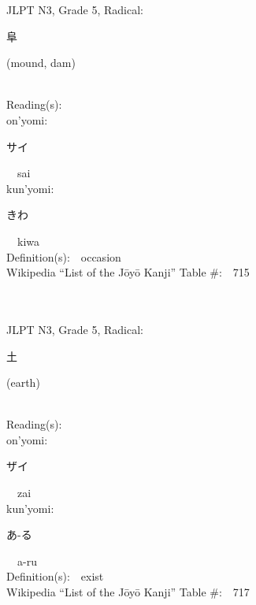 \begin{multicols}{2}
{JLPT N3, Grade 5, Radical:\ \ {\begin{CJK}{UTF8}{min} 阜 \end{CJK}} (mound, dam) } \\
Reading(s):\ \ \\
{\hspace*{1em}}on'yomi:\ \ \\
{\hspace*{2em}}{\begin{CJK}{UTF8}{min} サイ \end{CJK}}\ \ sai\ \ \\
{\hspace*{1em}}kun'yomi:\ \ \\
{\hspace*{2em}}{\begin{CJK}{UTF8}{min} きわ \end{CJK}}\ \ kiwa\ \ \\
Definition(s):\ \ occasion \\
Wikipedia ``List of the J\=oy\=o Kanji'' Table \#:\ \ 715 \\
\ \ \\
{\fontsize{34pt}{40pt}  }\ \ \\  %
{JLPT N3, Grade 5, Radical:\ \ {\begin{CJK}{UTF8}{min} 土 \end{CJK}} (earth) } \\
Reading(s):\ \ \\
{\hspace*{1em}}on'yomi:\ \ \\
{\hspace*{2em}}{\begin{CJK}{UTF8}{min} ザイ \end{CJK}}\ \ zai\ \ \\
{\hspace*{1em}}kun'yomi:\ \ \\
{\hspace*{2em}}{\begin{CJK}{UTF8}{min} あ-る \end{CJK}}\ \ a-ru\ \ \\
Definition(s):\ \ exist \\
Wikipedia ``List of the J\=oy\=o Kanji'' Table \#:\ \ 717 \\
\ \ \\
{\fontsize{34pt}{40pt}  }\ \ \\  %

\end{multicols}
